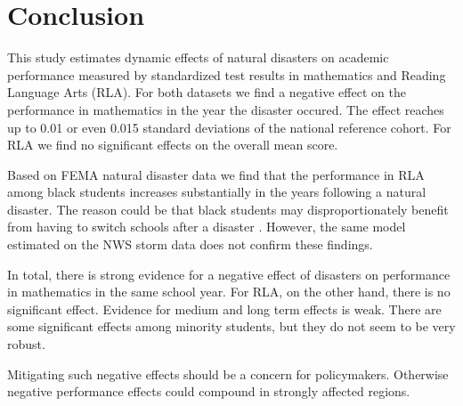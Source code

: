 \section{Conclusion} \label{Conclusion}

This study estimates dynamic effects of natural disasters on academic performance measured by standardized test results in mathematics and Reading Language Arts (RLA). For both datasets we find a negative effect on the performance in mathematics in the year the disaster occured. The effect reaches up to 0.01 or even 0.015 standard deviations of the national reference cohort. For RLA we find no significant effects on the overall mean score.

Based on FEMA natural disaster data we find that the performance in RLA among black students increases substantially in the years following a natural disaster. The reason could be that black students may disproportionately benefit from having to switch schools after a disaster \citep{Sacerdote_2012}. However, the same model estimated on the NWS storm data does not confirm these findings.

In total, there is strong evidence for a negative effect of disasters on performance in mathematics in the same school year. For RLA, on the other hand, there is no significant effect. Evidence for medium and long term effects is weak.  There are some significant effects among minority students, but they do not seem to be very robust.

Mitigating such negative effects should be a concern for policymakers. Otherwise negative performance effects could compound in strongly affected regions. 




